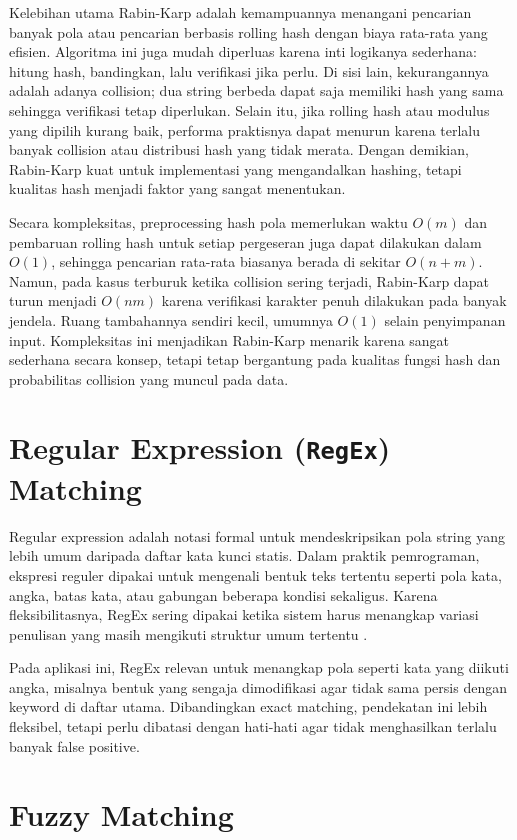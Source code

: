 Kelebihan utama Rabin-Karp adalah kemampuannya menangani pencarian banyak pola atau pencarian berbasis rolling hash dengan biaya rata-rata yang efisien. Algoritma ini juga mudah diperluas karena inti logikanya sederhana: hitung hash, bandingkan, lalu verifikasi jika perlu. Di sisi lain, kekurangannya adalah adanya collision; dua string berbeda dapat saja memiliki hash yang sama sehingga verifikasi tetap diperlukan. Selain itu, jika rolling hash atau modulus yang dipilih kurang baik, performa praktisnya dapat menurun karena terlalu banyak collision atau distribusi hash yang tidak merata. Dengan demikian, Rabin-Karp kuat untuk implementasi yang mengandalkan hashing, tetapi kualitas hash menjadi faktor yang sangat menentukan.

Secara kompleksitas, preprocessing hash pola memerlukan waktu $O(m)$ dan pembaruan rolling hash untuk setiap pergeseran juga dapat dilakukan dalam $O(1)$, sehingga pencarian rata-rata biasanya berada di sekitar $O(n + m)$. Namun, pada kasus terburuk ketika collision sering terjadi, Rabin-Karp dapat turun menjadi $O(nm)$ karena verifikasi karakter penuh dilakukan pada banyak jendela. Ruang tambahannya sendiri kecil, umumnya $O(1)$ selain penyimpanan input. Kompleksitas ini menjadikan Rabin-Karp menarik karena sangat sederhana secara konsep, tetapi tetap bergantung pada kualitas fungsi hash dan probabilitas collision yang muncul pada data.

\section{Regular Expression (\texttt{RegEx}) Matching}

Regular expression adalah notasi formal untuk mendeskripsikan pola string yang lebih umum daripada daftar kata kunci statis. Dalam praktik pemrograman, ekspresi reguler dipakai untuk mengenali bentuk teks tertentu seperti pola kata, angka, batas kata, atau gabungan beberapa kondisi sekaligus. Karena fleksibilitasnya, RegEx sering dipakai ketika sistem harus menangkap variasi penulisan yang masih mengikuti struktur umum tertentu \cite{mdnregexp}.

Pada aplikasi ini, RegEx relevan untuk menangkap pola seperti kata yang diikuti angka, misalnya bentuk yang sengaja dimodifikasi agar tidak sama persis dengan keyword di daftar utama. Dibandingkan exact matching, pendekatan ini lebih fleksibel, tetapi perlu dibatasi dengan hati-hati agar tidak menghasilkan terlalu banyak false positive.

\section{Fuzzy Matching}

